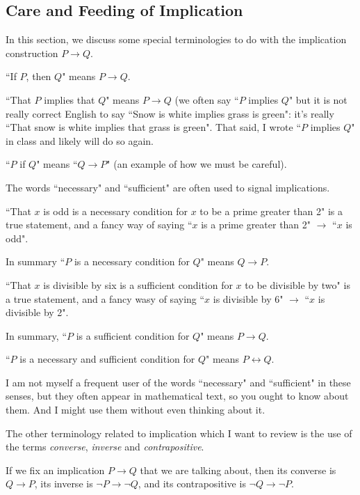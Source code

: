\documentclass[12pt]{article}
\begin{document}
\subsection{Care and Feeding of Implication}

In this section, we discuss some special terminologies to do with the implication construction $P \rightarrow Q$.

``If $P$, then $Q$" means $P \rightarrow Q$.

``That $P$ implies that $Q$" means $P \rightarrow Q$  (we often say ``$P$ implies $Q$" but it is not really correct English to say
``Snow is white implies grass is green":  it's really ``That snow is white implies that grass is green".  That said, I wrote ``$P$ implies $Q$" in class and likely will do so again.

``$P$ if $Q$" means ``$Q \rightarrow P$" (an example of how we must be careful).

The words ``necessary" and ``sufficient" are often used to signal implications.

``That $x$ is odd is a necessary condition for $x$ to be a prime greater than 2"  is a true statement, and a fancy way of saying
``$x$ is a prime greater than 2" $\rightarrow$ ``$x$ is odd".

In summary ``$P$ is a necessary condition for $Q$" means $Q \rightarrow P$.

``That $x$ is divisible by six is a sufficient condition for $x$ to be divisible by two" is a true statement, and a fancy wasy of saying ``$x$ is divisible by 6" $\rightarrow$ ``$x$ is divisible by 2".

In summary, ``$P$ is a sufficient condition for $Q$" means $P \rightarrow Q$.

``$P$ is a necessary and sufficient condition for $Q$" means $P \leftrightarrow Q$.

I am not myself a frequent user of the words ``necessary" and ``sufficient" in these senses, but they often appear in mathematical text, so you ought to know about them.  And I might use them without even thinking about it.

The other terminology related to implication which I want to review is the use of the terms {\em converse\/}, {\em inverse\/} and {\em contrapositive\/}.

If we fix an implication $P \rightarrow Q$ that we are talking about, then its converse is $Q \rightarrow P$, its inverse is $\neg P \rightarrow \neg Q$, and its contrapositive is $\neg Q \rightarrow \neg P$.
\end{document}
